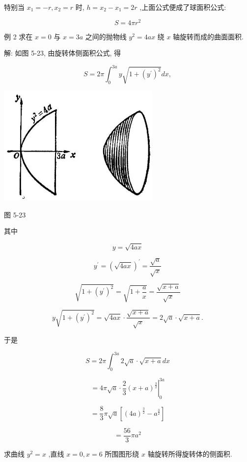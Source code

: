\documentclass[lang=cn,newtx,12pt,scheme=chinese]{elegantbook}
\begin{document}
特别当 \({x}_{1} = - r,{x}_{2} = r\) 时, \(h = {x}_{2} - {x}_{1} = {2r}\) ,上面公式便成了球面积公式:

\[
S = {4\pi }{r}^{2}
\]

例 2 求在 \(x = 0\) 与 \(x = {3a}\) 之间的抛物线 \({y}^{2} = {4ax}\) 绕 \(x\) 轴旋转而成的曲面面积.

解: 如图 5-23, 由旋转体侧面积公式, 得

\[
S = {2\pi }{\int }_{0}^{3a}y\sqrt{1 + {\left( {y}^{\prime }\right) }^{2}}{dx},
\]

\begin{center}
\includegraphics[max width=0.6\textwidth]{images/01912c18-5c3f-733d-b775-749ba9897a9d_247_426094.jpg}
\end{center}

图 5-23

其中

\[
y = \sqrt{4ax}
\]

\[
{y}^{\prime } = {\left( \sqrt{4ax}\right) }^{\prime } = \frac{\sqrt{a}}{\sqrt{x}}
\]

\[
\sqrt{1 + {\left( {y}^{\prime }\right) }^{2}} = \sqrt{1 + \frac{a}{x}} = \frac{\sqrt{x + a}}{\sqrt{x}}
\]

\[
y\sqrt{1 + {\left( {y}^{\prime }\right) }^{2}} = \sqrt{4ax} \cdot \frac{\sqrt{x + a}}{\sqrt{x}} = 2\sqrt{a} \cdot \sqrt{x + a}.
\]

于是

\[
S = {2\pi }{\int }_{0}^{3a}2\sqrt{a} \cdot \sqrt{x + a}{dx}
\]

\[
= {\left. 4\pi \sqrt{a} \cdot \frac{2}{3}{\left( x + a\right) }^{\frac{3}{2}}\right| }_{0}^{3a}
\]

\[
= \frac{8}{3}\pi \sqrt{a}\left\lbrack {{\left( 4a\right) }^{\frac{3}{2}} - {a}^{\frac{3}{2}}}\right\rbrack
\]

\[
= \frac{56}{3}\pi {a}^{2}
\]

\begin{problemset}[练习]

\item 求曲线 \({y}^{2} = x\) ,直线 \(x = 0,x = 6\) 所围图形绕 \(x\) 轴旋转所得旋转体的侧面积.

\end{problemset}
\end{document}
